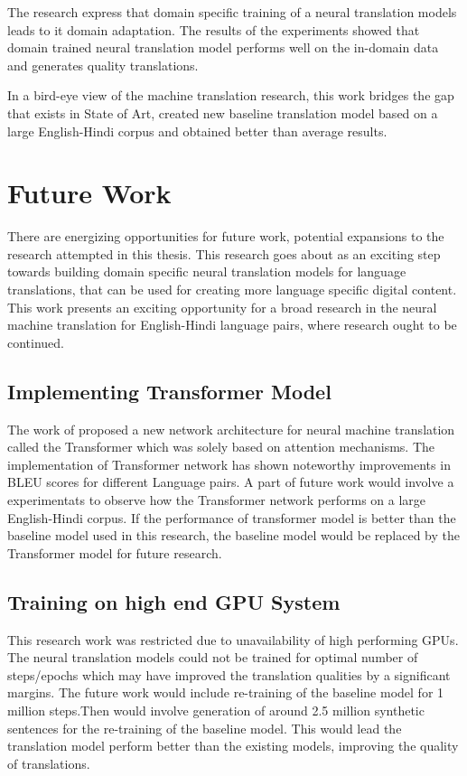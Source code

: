 The research express that domain specific training of a neural translation models leads to it domain adaptation. The results of the experiments showed that domain trained neural translation model performs well on the in-domain data and generates quality translations. 

In a bird-eye view of the machine translation research, this work bridges the gap that exists in State of Art, created new baseline translation model based on a large English-Hindi corpus and obtained better than average results.
\section{Future Work}
There are energizing opportunities for future work, potential expansions to the research attempted in this thesis. This research goes about as an exciting step towards building domain specific neural translation models for language translations, that can be used for creating more language specific digital content. This work presents an exciting opportunity for  a broad research in the neural machine translation for English-Hindi language pairs, where research ought to be continued.

\subsection{Implementing Transformer Model}
The work of \cite{DBLP:journals/corr/VaswaniSPUJGKP17} proposed a new network architecture for neural machine translation called the Transformer which was solely based on attention mechanisms. The implementation of Transformer network has shown noteworthy improvements in BLEU scores for different Language pairs. A part of future work would involve a experimentats to observe how the Transformer network performs on a large English-Hindi corpus. If the performance of transformer model is better than the baseline model used in this research, the baseline model would be replaced by the Transformer model for future research. 

\subsection{Training on high end GPU System}
This research work was restricted due to unavailability of high performing GPUs. The neural translation models could not be trained for optimal number of steps/epochs which may have improved the translation qualities by a significant margins. The future work would include re-training of the baseline model for 1 million steps.Then would involve generation of around 2.5 million synthetic sentences for the re-training of the baseline model. This would lead the translation model perform better than the existing models, improving the quality of translations. 
